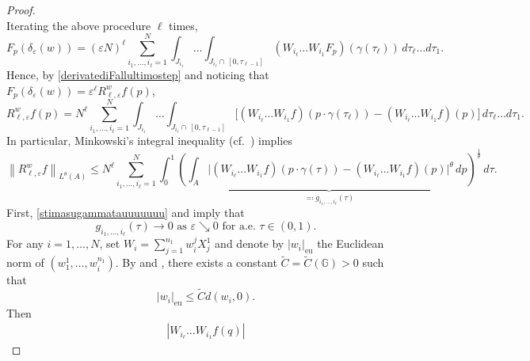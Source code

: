 \documentclass[11pt]{amsart}
\newcommand{\eps}{\varepsilon}
\theoremstyle{plain}
\theoremstyle{definition}
\theoremstyle{remark}
\numberwithin{equation}{section}
\begin{document}
\begin{proof}
\begin{equation*}
    \end{equation*}
    Iterating the above procedure $\ell$ times,
     \begin{equation*}
        F_p\left(\delta_\eps(w)\right)=(\eps N)^\ell\sum_{i_1,\ldots,i_\ell=1}^N\int_{J_{i_1}}\dots\int_{J_{i_\ell}\cap \, [0,\tau_{\ell-1}]}\left(W_{i_\ell}\ldots W_{i_1}F_p\right)(\gamma(\tau_\ell))\,d\tau_\ell\ldots d\tau_1.
    \end{equation*}
    Hence, by \eqref{derivatediFallultimostep} and noticing that $F_p(\delta_\eps(w))=\eps^\ell R^w_{\ell,\eps} f(p)$,
    \begin{equation*}
        R^w_{\ell,\eps}f(p)=N^\ell \sum_{i_1,\ldots,i_\ell=1}^N\int_{J_{i_1}}\dots\int_{J_{i_\ell}\cap \, [0,\tau_{\ell-1}]}\Big[\left(W_{i_\ell}\ldots W_{i_1 }f\right)(p\cdot \gamma(\tau_\ell))-\left(W_{i_\ell}\ldots W_{i_1}f\right)(p)\Big]\,d\tau_\ell\ldots d\tau_1.
    \end{equation*} 
    In particular, Minkowski's integral inequality (cf.~\cite[Corollary B.83]{MR3726909}) implies
    \begin{equation}\label{aftermif56889}
        \left\|R^w_{\ell,\eps}f \right\|_{L^\theta(A)}\leq N^\ell\sum_{i_1,\ldots,i_\ell=1}^N\int_0^1\underbrace{\left(\int_A\Big|\left(W_{i_\ell}\ldots W_{i_1}f\right)(p\cdot \gamma(\tau))-\left(W_{i_\ell}\ldots W_{i_1}f\right)(p)\Big|^\theta\,dp\right)^\frac{1}{\theta}}_{\eqqcolon g_{i_1,\ldots,i_\ell}(\tau)}\,d\tau.
    \end{equation} 
    First, \eqref{stimasugammatauuuuuuu} and  imply that 
    \begin{equation}\label{aeconv38586795838587}
        \text{$g_{i_1,\ldots,i_\ell}(\tau)\to 0$ as $\eps\searrow 0$ for a.e.~$\tau\in (0,1)$.}
    \end{equation} 
    For any $i=1,\ldots, N$, set $W_i=\sum_{j=1}^{n_1}w^j_i X^1_j$ and denote by $|w_i|_\mathrm{eu}$ the Euclidean norm of $(w_1^1,\ldots,w_i^{n_1})$. By \cite[Example 5.1.2]{BonLanUgu} and \cite[Proposition 5.1.4]{BonLanUgu}, there exists a constant $\tilde C=\tilde C(\mathbb G)>0$ such that 
\begin{equation}\label{stimaeucondcc}
    |w_i|_\mathrm{eu}\leq\tilde Cd(w_i,0).
\end{equation}
  Then
    \begin{equation*}
        \begin{split}
            \left|W_{i_\ell}\ldots W_{i_1}f(q)\right|

\end{split}
\end{equation*}
\end{proof}
\end{document}
